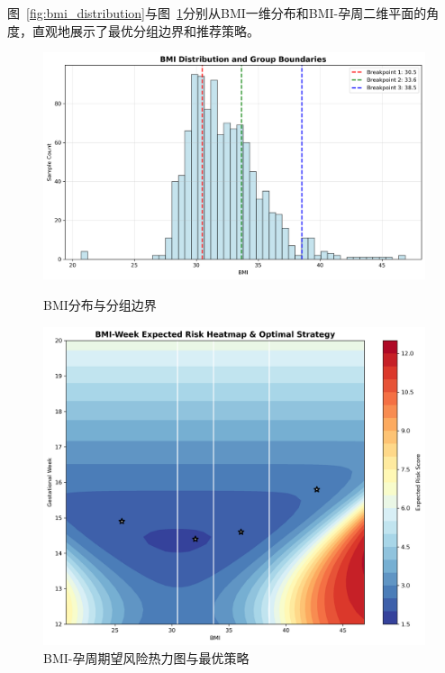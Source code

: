 \documentclass[12pt,a4paper]{ctexart}
\numberwithin{equation}{section}
\theoremstyle{mcm}
\begin{document}
图~\ref{fig:bmi_distribution}与图~\ref{fig:bmi_week_heatmap}分别从BMI一维分布和BMI-孕周二维平面的角度，直观地展示了最优分组边界和推荐策略。

\begin{figure}[htbp]
    \centering
    \begin{minipage}{0.48\textwidth}
        \centering
        \includegraphics[width=\textwidth]{q2/bmi_distribution_with_boundaries.png}
        \caption{BMI分布与分组边界}
        \label{fig:bmi_distribution}
    \end{minipage}
    \hfill
    \begin{minipage}{0.48\textwidth}
        \centering
        \includegraphics[width=\textwidth]{q2/bmi_week_risk_heatmap.png}
        \caption{BMI-孕周期望风险热力图与最优策略}
        \label{fig:bmi_week_heatmap}
    \end{minipage}
\end{figure}
\end{document}
